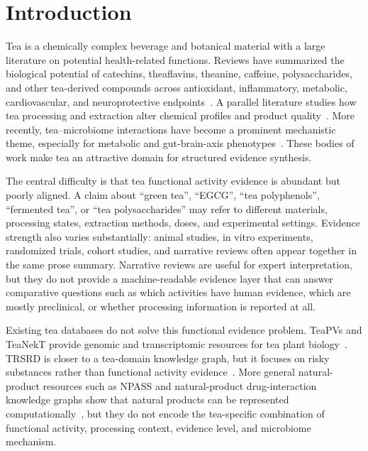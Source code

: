 \documentclass[11pt]{article}
\begin{document}
\section{Introduction}

Tea is a chemically complex beverage and botanical material with a large literature on potential health-related functions. Reviews have summarized the biological potential of catechins, theaflavins, theanine, caffeine, polysaccharides, and other tea-derived compounds across antioxidant, inflammatory, metabolic, cardiovascular, and neuroprotective endpoints~\cite{luo2024tea_bioactive_review,yang2025bioavailability_tea_polyphenols,rashwan2025tea_polysaccharides_review}. A parallel literature studies how tea processing and extraction alter chemical profiles and product quality~\cite{raghunath2023tea_extraction_review,aaqil2023black_tea_processing_review,wang2024processing_metabolomics}. More recently, tea--microbiome interactions have become a prominent mechanistic theme, especially for metabolic and gut-brain-axis phenotypes~\cite{zhao2024processed_tea_microbiota,song2024oolong_neuroprotection,tian2024obesity_microbiota}. These bodies of work make tea an attractive domain for structured evidence synthesis.

The central difficulty is that tea functional activity evidence is abundant but poorly aligned. A claim about ``green tea'', ``EGCG'', ``tea polyphenols'', ``fermented tea'', or ``tea polysaccharides'' may refer to different materials, processing states, extraction methods, doses, and experimental settings. Evidence strength also varies substantially: animal studies, in vitro experiments, randomized trials, cohort studies, and narrative reviews often appear together in the same prose summary. Narrative reviews are useful for expert interpretation, but they do not provide a machine-readable evidence layer that can answer comparative questions such as which activities have human evidence, which are mostly preclinical, or whether processing information is reported at all.

Existing tea databases do not solve this functional evidence problem. TeaPVs and TeaNekT provide genomic and transcriptomic resources for tea plant biology~\cite{an2022teapvs,zheng2024teanekt}. TRSRD is closer to a tea-domain knowledge graph, but it focuses on risky substances rather than functional activity evidence~\cite{wang2023trsrd}. More general natural-product resources such as NPASS and natural-product drug-interaction knowledge graphs show that natural products can be represented computationally~\cite{zhao2023npass_update,taneja2023npdi_kg}, but they do not encode the tea-specific combination of functional activity, processing context, evidence level, and microbiome mechanism.
\end{document}
